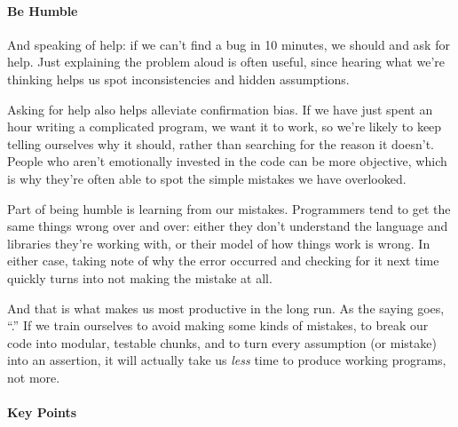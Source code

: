 \documentclass{book}
\begin{document}
\mbox{}\paragraph{Be Humble}

And speaking of help: if we can't find a bug in 10 minutes, we should
 and ask for help. Just
explaining the problem aloud is often useful, since hearing what we're
thinking helps us spot inconsistencies and hidden assumptions.

Asking for help also helps alleviate confirmation bias. If we have just
spent an hour writing a complicated program, we want it to work, so
we're likely to keep telling ourselves why it should, rather than
searching for the reason it doesn't. People who aren't emotionally
invested in the code can be more objective, which is why they're often
able to spot the simple mistakes we have overlooked.

Part of being humble is learning from our mistakes. Programmers tend to
get the same things wrong over and over: either they don't understand
the language and libraries they're working with, or their model of how
things work is wrong. In either case, taking note of why the error
occurred and checking for it next time quickly turns into not making the
mistake at all.

And that is what makes us most productive in the long run. As the saying
goes, ``.'' If we train
ourselves to avoid making some kinds of mistakes, to break our code into
modular, testable chunks, and to turn every assumption (or mistake) into
an assertion, it will actually take us \emph{less} time to produce
working programs, not more.

\mbox{}\paragraph{Key Points}
\end{document}
